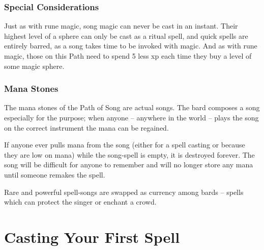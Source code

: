 \begin{multicols}{2}
\subsubsection{Special Considerations}

Just as with rune magic, song magic can never be cast in an instant.  Their highest level of a sphere can only be cast as a ritual spell, and quick spells are entirely barred, as a song takes time to be invoked with magic.  And as with rune magic, those on this Path need to spend 5 less \gls{xp} each time they buy a level of some magic sphere.

\subsubsection{Mana Stones}

The mana stones of the Path of Song are actual songs.
The bard composes a song especially for the purpose; when anyone -- anywhere in the world -- plays the song on the correct instrument the mana can be regained.

If anyone ever pulls mana from the song (either for a spell casting or because they are low on mana) while the song-spell is empty, it is destroyed forever.
The song will be difficult for anyone to remember and will no longer store any mana until someone remakes the spell.

Rare and powerful spell-songs are swapped as currency among bards -- spells which can protect the singer or enchant a crowd.

\end{multicols}

\section[Spellcasting]{Casting Your First Spell}

